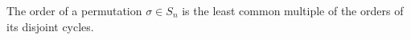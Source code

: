 \begin{theorem}
The order of a permutation $\sigma \in S_n$ is the least common multiple of the orders of its disjoint cycles.
\end{theorem}

